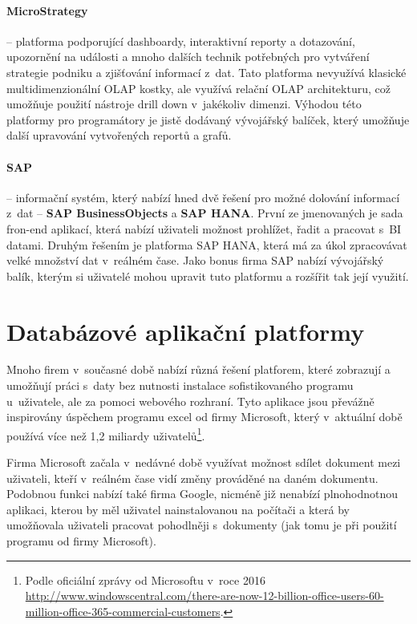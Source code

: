 \paragraph{MicroStrategy} -- platforma podporující dashboardy, interaktivní reporty a dotazování, upozornění na události a mnoho dalších technik potřebných pro vytváření strategie podniku a zjišťování informací z~dat. Tato platforma nevyužívá klasické multidimenzionální OLAP kostky, ale využívá relační OLAP architekturu, což umožňuje použití nástroje drill down v~jakékoliv dimenzi. Výhodou této platformy pro programátory je jistě dodávaný vývojářský balíček, který umožňuje další upravování vytvořených reportů a grafů. \cite{microstrategy}

\paragraph{SAP} -- informační systém, který nabízí hned dvě řešení pro možné dolování informací z~dat -- \textbf{SAP BusinessObjects} a \textbf{SAP HANA}. První ze jmenovaných je sada fron-end aplikací, která nabízí uživateli možnost prohlížet, řadit a pracovat s~BI datami. Druhým řešením je platforma SAP HANA, která má za úkol zpracovávat velké množství dat v~reálném čase. Jako bonus firma SAP nabízí vývojářský balík, kterým si uživatelé mohou upravit tuto platformu a rozšířit tak její využití. \cite{sap}

\section{Databázové aplikační platformy}
\par Mnoho firem v~současné době nabízí různá řešení platforem, které zobrazují a umožňují práci s~daty bez nutnosti instalace sofistikovaného programu u~uživatele, ale za pomoci webového rozhraní. Tyto aplikace jsou převážně inspirovány úspěchem programu excel od firmy Microsoft, který v~aktuální době používá více než 1,2 miliardy uživatelů\footnote{Podle oficiální zprávy od Microsoftu v~roce 2016 \url{http://www.windowscentral.com/there-are-now-12-billion-office-users-60-million-office-365-commercial-customers}.}.

\par Firma Microsoft začala v~nedávné době využívat možnost sdílet dokument mezi uživateli, kteří v~reálném čase vidí změny prováděné na daném dokumentu. Podobnou funkci nabízí také firma Google, nicméně již nenabízí plnohodnotnou aplikaci, kterou by měl uživatel nainstalovanou na počítači a která by umožňovala uživateli pracovat pohodlněji s~dokumenty (jak tomu je při použití programu od firmy Microsoft).

